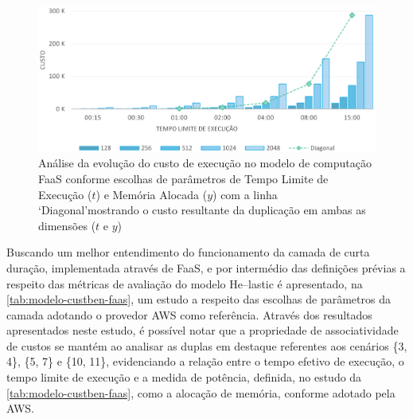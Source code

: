\documentclass[english,brazilian]{UNISINOSmonografia} %
\begin{document}
\begin{figure}[tb]
	\centering%
	\begin{minipage}{\textwidth}
		\caption[Análise da evolução do custo de execução no modelo de computação FaaS conforme escolhas de parâmetros de Tempo Limite de Execução ($t$) e Memória Alocada ($y$)]{Análise da evolução do custo de execução no modelo de computação FaaS conforme escolhas de parâmetros de Tempo Limite de Execução ($t$) e Memória Alocada ($y$) com a linha \textquoteleft Diagonal\textquoteright mostrando o custo resultante da duplicação em ambas as dimensões ($ t $ e $ y $)}
		\label{fig:modelo-custben-faas}
		\vspace{1ex}
		\includegraphics[width=\textwidth]{modelo-custben-faas}
	\end{minipage}
\end{figure}


Buscando um melhor entendimento do funcionamento da camada de curta duração, implementada através de FaaS, e por intermédio das definições prévias a respeito das métricas de avaliação do modelo \textsf{He}--lastic é apresentado, na \autoref{tab:modelo-custben-faas}, um estudo a respeito das escolhas de parâmetros da camada adotando o provedor AWS como referência.
Através dos resultados apresentados neste estudo, é possível notar que a propriedade de associatividade de custos se mantém ao analisar as duplas em destaque referentes aos cenários \{3, 4\}, \{5, 7\} e \{10, 11\}, evidenciando a relação entre o tempo efetivo de execução, o tempo limite de execução e a medida de potência, definida, no estudo da \autoref{tab:modelo-custben-faas}, como a alocação de memória, conforme adotado pela AWS.
\end{document}
